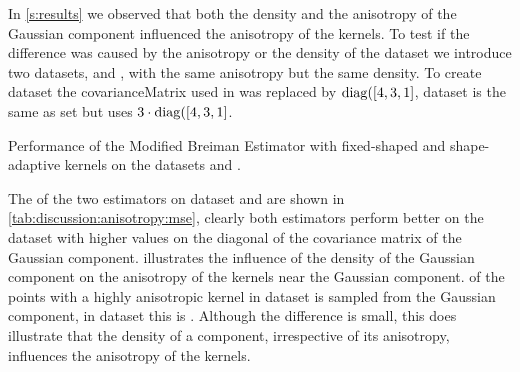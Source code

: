 	In \cref{s:results} we observed that both the density and the anisotropy of the Gaussian component influenced the anisotropy of the kernels. To test if the difference was caused by the anisotropy or the density of the dataset we introduce two datasets, \anisotropyOne and \anisotropyTwo, with the same anisotropy but the same density. To create dataset \anisotropyOne the covarianceMatrix used in \ferdosiOne was replaced by $\operatorname{diag}([4, 3, 1]$, dataset \anisotropyTwo is the same as set \anisotropyOne but uses $3 \cdot \operatorname{diag}([4, 3, 1]$.
	\begin{table}
		\centering
		
		\caption{Performance of the Modified Breiman Estimator with fixed-shaped and shape-adaptive kernels on the datasets \anisotropyOne and \anisotropyTwo.} 	
		\label{tab:discussion:anisotropy:mse}
	\end{table}
	The \mses of the two estimators on dataset \anisotropyOne and \anisotropyTwo are shown in \cref{tab:discussion:anisotropy:mse}, clearly both estimators perform better on the dataset with higher values on the diagonal of the covariance matrix of the Gaussian component.
	 illustrates the influence of the density of the Gaussian component  on the anisotropy of the kernels near the Gaussian component.  of the points with a highly anisotropic kernel in dataset \anisotropyOne is sampled from the Gaussian component, in dataset \anisotropyTwo this is . Although the difference is small, this does illustrate that the density of a component, irrespective of its anisotropy, influences the anisotropy of the kernels. 
